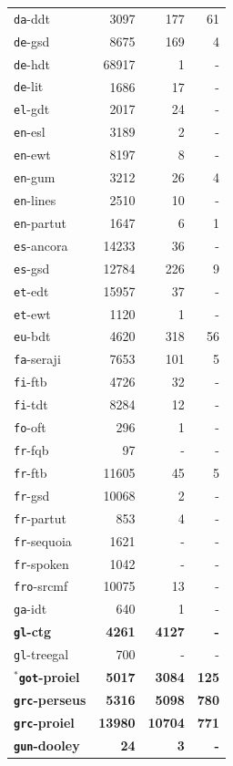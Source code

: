 \begin{table}[H]
{\begin{tabular}{|l|r|r|r|}
\texttt{da}-ddt & 3097 & 177 & 61\\
\texttt{de}-gsd & 8675 & 169 & 4\\
\texttt{de}-hdt & 68917 & 1 & -\\
\texttt{de}-lit & 1686 & 17 & -\\
\texttt{el}-gdt & 2017 & 24 & -\\
\texttt{en}-esl & 3189 & 2 & -\\
\texttt{en}-ewt & 8197 & 8 & -\\
\texttt{en}-gum & 3212 & 26 & 4\\
\texttt{en}-lines & 2510 & 10 & -\\
\texttt{en}-partut & 1647 & 6 & 1\\
\texttt{es}-ancora & 14233 & 36 & -\\
\texttt{es}-gsd & 12784 & 226 & 9\\
\texttt{et}-edt & 15957 & 37 & -\\
\texttt{et}-ewt & 1120 & 1 & -\\
\texttt{eu}-bdt & 4620 & 318 & 56\\
\texttt{fa}-seraji & 7653 & 101 & 5\\
\texttt{fi}-ftb & 4726 & 32 & -\\
\texttt{fi}-tdt & 8284 & 12 & -\\
\texttt{fo}-oft & 296 & 1 & -\\
\texttt{fr}-fqb & 97 & - & -\\
\texttt{fr}-ftb & 11605 & 45 & 5\\
\texttt{fr}-gsd & 10068 & 2 & -\\
\texttt{fr}-partut & 853 & 4 & -\\
\texttt{fr}-sequoia & 1621 & - & - \\
\texttt{fr}-spoken & 1042 & - & -\\
\texttt{fro}-srcmf & 10075 & 13 & -\\
\texttt{ga}-idt & 640 & 1 & -\\
\textbf{\texttt{gl}-ctg} & \textbf{4261} & \textbf{4127} & \textbf{-}\\
\texttt{gl}-treegal & 700 & - & -\\
$^{*}$\textbf{\texttt{got}-proiel} & \textbf{5017} & \textbf{3084} & \textbf{125}\\
\textbf{\texttt{grc}-perseus} & \textbf{5316} & \textbf{5098} & \textbf{780}\\
\textbf{\texttt{grc}-proiel} & \textbf{13980} & \textbf{10704} & \textbf{771}\\
\textbf{\texttt{gun}-dooley} & \textbf{24} & \textbf{3} & \textbf{-}\\

\end{tabular}}
\end{table}
